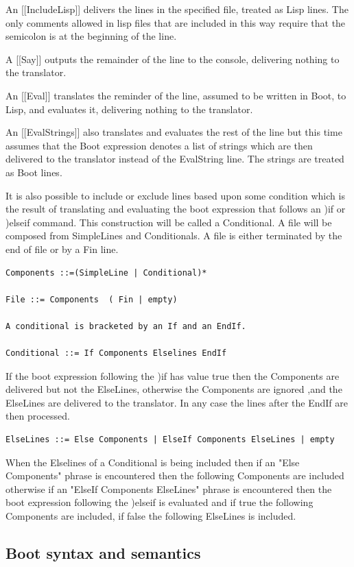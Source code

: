 \documentclass{article}
\begin{document}
An [[IncludeLisp]] delivers the lines in the specified file, treated as Lisp
lines. The only comments allowed in lisp files that are included in
this way require that the semicolon is at the beginning of the line.

A [[Say]] outputs the remainder of the line to the console,
   delivering nothing to the translator.

An [[Eval]] translates the reminder of the line, assumed to be
   written in Boot, to Lisp, and evaluates it, delivering nothing to
   the translator.

An [[EvalStrings]] also translates and evaluates the rest of the line
   but this time assumes that the Boot expression denotes a list
   of strings which are then delivered to the translator
   instead of the EvalString line. The strings are treated as Boot lines.

It is also possible to include or exclude lines based upon some
condition which is the result of translating and evaluating
the boot expression that follows an )if or )elseif command.
This construction will be called a Conditional. A file will be
composed from SimpleLines and Conditionals. A file is either
terminated by the end of file or by a Fin line.
\begin{verbatim}
Components ::=(SimpleLine | Conditional)*

File ::= Components  ( Fin | empty)

A conditional is bracketed by an If and an EndIf.

Conditional ::= If Components Elselines EndIf
\end{verbatim}

If the boot expression following the )if has value true then the
Components are delivered but not the ElseLines,
otherwise the Components are ignored ,and the ElseLines
are delivered to the translator. In any case the lines after
the EndIf are then processed.
\begin{verbatim}
ElseLines ::= Else Components | ElseIf Components ElseLines | empty
\end{verbatim}

When the Elselines of a Conditional is being included then if an
"Else Components" phrase is encountered then the following
Components are included
otherwise if an "ElseIf Components ElseLines" phrase is encountered then
the boot expression following the )elseif is evaluated and
if true the following Components are included, if false the
following ElseLines is included.


\subsection{Boot syntax and semantics}
\end{document}
